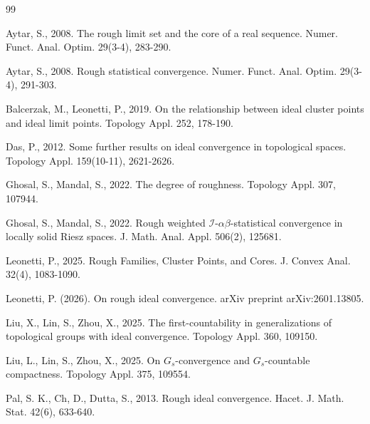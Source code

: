 \documentclass[11pt]{amsart}
\begin{document}
\begin{thebibliography}{99}

	 Aytar, S., 2008. The rough limit set and the core of a real sequence. Numer. Funct. Anal. Optim. 29(3-4), 283-290.
	
	 Aytar, S., 2008. Rough statistical convergence. Numer. Funct. Anal. Optim. 29(3-4), 291-303.
	
	 Balcerzak, M., Leonetti, P.,  2019. On the relationship between ideal cluster points and ideal limit points. Topology Appl. 252, 178-190.
	
	  Das, P., 2012. Some further results on ideal convergence in topological spaces. Topology Appl. 159(10-11), 2621-2626.
	
	 Ghosal, S., Mandal, S., 2022. The degree of roughness. Topology Appl. 307, 107944.
	
	 Ghosal, S., Mandal, S., 2022. Rough weighted $\mathcal{I}$-$\alpha\beta$-statistical convergence in locally solid Riesz spaces. J. Math. Anal. Appl. 506(2), 125681.  
	

	
	
     Leonetti, P., 2025. Rough Families, Cluster Points, and Cores. J. Convex Anal. 32(4), 1083-1090.

     Leonetti, P. (2026). On rough ideal convergence. arXiv preprint arXiv:2601.13805.%

  
     Liu, X., Lin, S., Zhou, X., 2025. The first-countability in generalizations of topological groups with ideal convergence. Topology Appl. 360, 109150.

     Liu, L., Lin, S., Zhou, X., 2025. On $G_s$-convergence and $G_s$-countable compactness. Topology Appl. 375, 109554.
	
	 Pal, S. K., Ch, D., Dutta, S., 2013. Rough ideal convergence. Hacet. J. Math. Stat. 42(6), 633-640.


\end{thebibliography}
\end{document}
